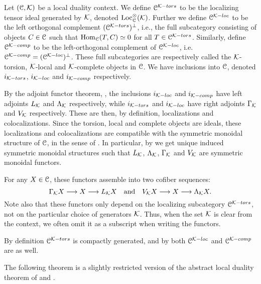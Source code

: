 \begin{construction}
    Let $(\EuScript{C}, \mathcal{K})$ be a local duality context. We define $\EuScript{C}^{\mathcal{K}-tors}$ to be the localizing tensor ideal generated by $\mathcal{K}$, denoted $\operatorname{Loc}^\otimes_{\EuScript{C}}(\mathcal{K})$. Further we define $\EuScript{C}^{\mathcal{K}-loc}$ to be the left orthogonal complement $(\EuScript{C}^{\mathcal{K}-tors})^\perp$, i.e., the full subcategory consisting of objects $C\in \EuScript{C}$ such that $\operatorname{Hom}_{\EuScript{C}}(T,C)\simeq 0$ for all $T\in \EuScript{C}^{\mathcal{K}-tors}$. Similarly, define $\EuScript{C}^{\mathcal{K}-comp}$ to be the left-orthogonal complement of $\EuScript{C}^{\mathcal{K}-loc}$, i.e. $\EuScript{C}^{\mathcal{K}-comp}= (\EuScript{C}^{\mathcal{K}-loc})^\perp$. These full subcategories are respectively called the $\mathcal{K}$-torsion, $\mathcal{K}$-local and $\mathcal{K}$-complete objects in $\EuScript{C}$. We have inclusions into $\EuScript{C}$, denoted $i_{\mathcal{K}-tors}$, $i_{\mathcal{K}-loc}$ and $i_{\mathcal{K}-comp}$ respectively. 
    
    By the adjoint functor theorem, \cite[5.5.2.9]{lurie_09}, the inclusions $i_{\mathcal{K}-loc}$ and $i_{\mathcal{K}-comp}$ have left adjoints $L_{\mathcal{K}}$ and $\Lambda_{\mathcal{K}}$ respectively, while $i_{\mathcal{K}-tors}$ and $i_{\mathcal{K}-loc}$ have right adjoints $\Gamma_{\mathcal{K}}$ and $V_{\mathcal{K}}$ respectively. These are then, by definition, localizations and colocalizations. Since the torsion, local and complete objects are ideals, these localizations and colocalizations are compatible with the symmetric monoidal structure of $\EuScript{C}$, in the sense of \cite[2.2.1.7]{Lurie_HA}. In particular, by \cite[2.2.1.9]{Lurie_HA} we get unique induced symmetric monoidal structures such that $L_{\mathcal{K}}$, $\Lambda_{\mathcal{K}}$, $\Gamma_{\mathcal{K}}$ and $V_{\mathcal{K}}$ are symmetric monoidal functors. 

    For any $X\in \EuScript{C}$, these functors assemble into two cofiber sequences:
    $$\Gamma_{\mathcal{K}} X \longrightarrow X \longrightarrow L_{\mathcal{K}} X \quad \text{and}\quad V_{\mathcal{K}} X \longrightarrow X \longrightarrow \Lambda_{\mathcal{K}} X.$$
    Note also that these functors only depend on the localizing subcategory $\EuScript{C}^{\mathcal{K}-tors}$, not on the particular choice of generators $\mathcal{K}$. Thus, when the set $\mathcal{K}$ is clear from the context, we often omit it as a subscript when writing the functors. 
\end{construction}

\begin{remark}
    \label{ch0:rm:tors-loc-comp-compactly-generated}
    By definition $\EuScript{C}^{\mathcal{K}-tors}$ is compactly generated, and by \cite[2.17]{barthel-heard-valenzuela_2018} both $\EuScript{C}^{\mathcal{K}-loc}$ and $\EuScript{C}^{\mathcal{K}-comp}$ are as well. 
\end{remark}

The following theorem is a slightly restricted version of the abstract local duality theorem of \cite[3.3.5]{hovey-palmiery-strickland_97} and \cite[2.21]{barthel-heard-valenzuela_2018}.  

